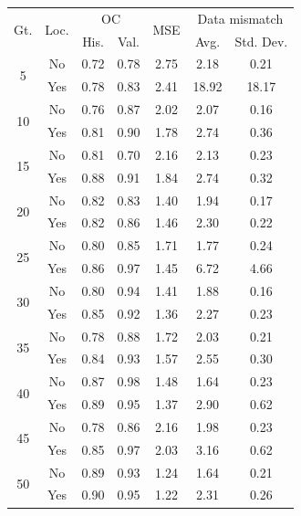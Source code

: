\begin{tabular}{ccccccc}
\toprule
\multirow{2}{*}{
    Gt.
}
&
\multirow{2}{*}{Loc.} 
& 
\multicolumn{2}{c}{OC} & 
\multirow{2}{*}{
    MSE
} & 
\multicolumn{2}{c}{Data mismatch} 
\\
& & His. & Val. &  & Avg. & Std. Dev.
\\
\midrule
\multirow{2}{*}{5} & No & 0.72 & 0.78 & 2.75 & 2.18 & 0.21 \\
 & Yes & 0.78 & 0.83 & 2.41 & 18.92 & 18.17 \\
\midrule
\multirow{2}{*}{10} & No & 0.76 & 0.87 & 2.02 & 2.07 & 0.16 \\
 & Yes & 0.81 & 0.90 & 1.78 & 2.74 & 0.36 \\
\midrule
\multirow{2}{*}{15} & No & 0.81 & 0.70 & 2.16 & 2.13 & 0.23 \\
 & Yes & 0.88 & 0.91 & 1.84 & 2.74 & 0.32 \\
\midrule
\multirow{2}{*}{20} & No & 0.82 & 0.83 & 1.40 & 1.94 & 0.17 \\
 & Yes & 0.82 & 0.86 & 1.46 & 2.30 & 0.22 \\
\midrule
\multirow{2}{*}{25} & No & 0.80 & 0.85 & 1.71 & 1.77 & 0.24 \\
 & Yes & 0.86 & 0.97 & 1.45 & 6.72 & 4.66 \\
\midrule
\multirow{2}{*}{30} & No & 0.80 & 0.94 & 1.41 & 1.88 & 0.16 \\
 & Yes & 0.85 & 0.92 & 1.36 & 2.27 & 0.23 \\
\midrule
\multirow{2}{*}{35} & No & 0.78 & 0.88 & 1.72 & 2.03 & 0.21 \\
 & Yes & 0.84 & 0.93 & 1.57 & 2.55 & 0.30 \\
\midrule
\multirow{2}{*}{40} & No & 0.87 & 0.98 & 1.48 & 1.64 & 0.23 \\
 & Yes & 0.89 & 0.95 & 1.37 & 2.90 & 0.62 \\
\midrule
\multirow{2}{*}{45} & No & 0.78 & 0.86 & 2.16 & 1.98 & 0.23 \\
 & Yes & 0.85 & 0.97 & 2.03 & 3.16 & 0.62 \\
\midrule
\multirow{2}{*}{50} & No & 0.89 & 0.93 & 1.24 & 1.64 & 0.21 \\
 & Yes & 0.90 & 0.95 & 1.22 & 2.31 & 0.26 \\
\bottomrule
\end{tabular}
